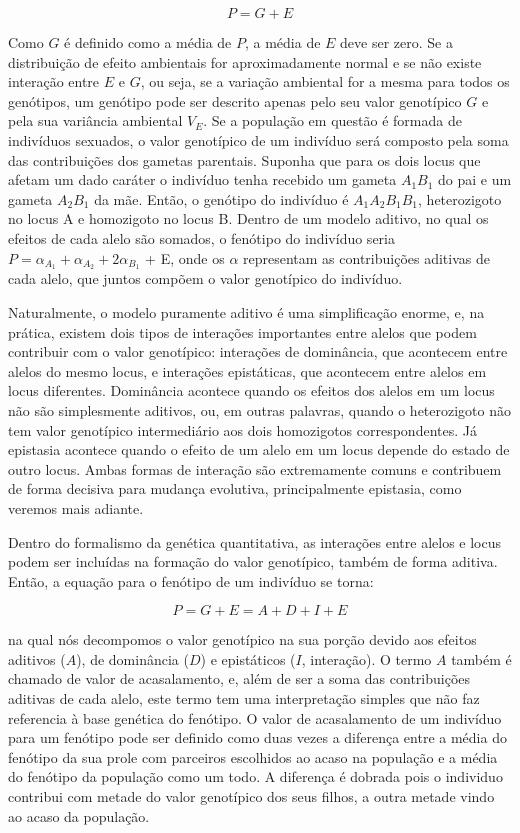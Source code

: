\begin{refsection}
\begin{equation}
P = G + E
\end{equation}

Como $G$ é definido como a média de $P$, a média de $E$ deve ser zero. Se a
distribuição de efeito ambientais for aproximadamente normal e se não existe
interação entre $E$ e $G$, ou seja, se a variação ambiental for a mesma para
todos os genótipos, um genótipo pode ser descrito apenas pelo seu valor
genotípico $G$ e pela sua variância ambiental $V_E$. Se a população em questão
é formada de indivíduos sexuados, o valor genotípico de um indivíduo será
composto pela soma das contribuições dos gametas parentais. Suponha que para os dois
locus que afetam um dado caráter o indivíduo tenha recebido um gameta $A_1B_1$
do pai e um gameta $A_2B_1$ da mãe. Então, o genótipo do indivíduo é
$A_1A_2B_1B_1$, heterozigoto no locus A e homozigoto no locus B. Dentro de um
modelo aditivo, no qual os efeitos de cada alelo são somados, o fenótipo do
indivíduo seria $P = \alpha_{A_1} + \alpha_{A_2} + 2\alpha_{B_1}$ + E, onde os
$\alpha$ representam as contribuições aditivas de cada alelo, que juntos
compõem o valor genotípico do indivíduo. 

Naturalmente, o modelo puramente aditivo é uma simplificação enorme, e, na
prática, existem dois tipos de interações importantes entre alelos que podem
contribuir com o valor genotípico: interações de dominância, que acontecem
entre alelos do mesmo locus, e interações epistáticas, que acontecem entre
alelos em locus diferentes. Dominância acontece quando os efeitos dos alelos
em um locus não são simplesmente aditivos, ou, em outras palavras, quando o
heterozigoto não tem valor genotípico intermediário aos dois homozigotos
correspondentes. Já epistasia acontece quando o efeito de um alelo em um locus
depende do estado de outro locus. Ambas formas de interação são extremamente
comuns e contribuem de forma decisiva para mudança evolutiva, principalmente
epistasia, como veremos mais adiante.

Dentro do formalismo da genética quantitativa, as interações entre alelos e
locus podem ser incluídas na formação do valor genotípico, também de forma
aditiva. Então, a equação para o fenótipo de um indivíduo se torna:

\begin{equation}
P = G + E = A +D + I + E
\end{equation}

na qual nós decompomos o valor genotípico na sua porção devido aos efeitos
aditivos ($A$), de dominância ($D$) e epistáticos ($I$, interação). O termo
$A$ também é chamado de valor de acasalamento, e, além de ser a soma das
contribuições aditivas de cada alelo, este termo tem uma interpretação simples
que não faz referencia à base genética do fenótipo. O valor de acasalamento de
um indivíduo para um fenótipo pode ser definido como duas vezes a diferença
entre a média do fenótipo da sua prole com parceiros escolhidos ao acaso na
população e a média do fenótipo da população como um todo. A diferença é
dobrada pois o individuo contribui com metade do valor genotípico dos seus
filhos, a outra metade vindo ao acaso da população.


\end{refsection}
